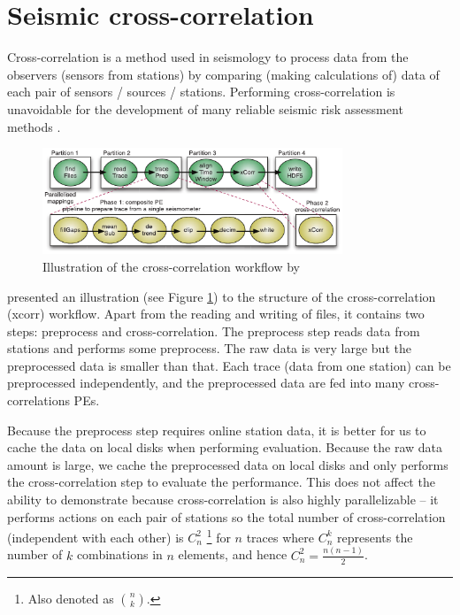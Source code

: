 \section{Seismic cross-correlation}
Cross-correlation is a method used in seismology to process data from the observers (\eg sensors from stations) by comparing (\ie making calculations of) data of each pair of sensors / sources / stations. Performing cross-correlation is unavoidable for the development of many reliable seismic risk assessment methods \cite{doi:10.1177/1094342016649766}.

\begin{figure}[h]
\centering
    \includegraphics[width=0.8\textwidth]{figures/wf_xcorr}
\caption{Illustration of the cross-correlation workflow by \citeauthor{doi:10.1177/1094342016649766}\cite{doi:10.1177/1094342016649766}}
\label{fig:wf_xcorr}
\end{figure}

\citeauthor{doi:10.1177/1094342016649766}\cite{doi:10.1177/1094342016649766} presented an illustration (see Figure \ref{fig:wf_xcorr}) to the structure of the cross-correlation (xcorr) workflow. Apart from the reading and writing of files, it contains two steps: preprocess and cross-correlation. The preprocess step reads data from stations and performs some preprocess. The raw data is very large but the preprocessed data is smaller than that. Each trace (data from one station) can be preprocessed independently, and the preprocessed data are fed into many cross-correlations PEs.

Because the preprocess step requires online station data, it is better for us to cache the data on local disks when performing evaluation. Because the raw data amount is large, we cache the preprocessed data on local disks and only performs the cross-correlation step to evaluate the performance. This does not affect the ability to demonstrate because cross-correlation is also highly parallelizable -- it performs actions on each pair of stations so the total number of cross-correlation (independent with each other) is $C^2_n$ \footnote{Also denoted as $\binom{n}{k}$.} for $n$ traces where $C^k_n$ represents the number of $k$ combinations in $n$ elements, and hence $C^2_n=\frac{n(n-1)}{2}$.

